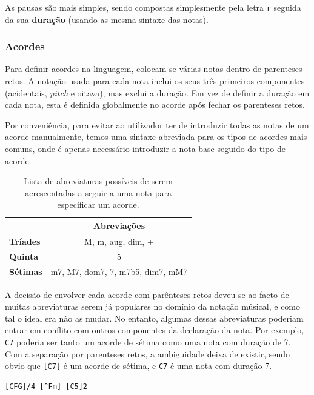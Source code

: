 As pausas são mais simples, sendo compostas simplesmente pela letra \texttt{r} seguida da sua \textbf{duração} (usando as mesma sintaxe das notas).

\subsubsection{\textbf{Acordes}}
Para definir acordes na linguagem, colocam-se várias notas dentro de parenteses retos. A notação usada para cada nota inclui os seus três primeiros componentes (acidentais, \textit{pitch} e oitava), mas exclui a duração. Em vez de definir a duração em cada nota, esta é definida globalmente no acorde após fechar os parenteses retos.

Por conveniência, para evitar ao utilizador ter de introduzir todas as notas de um acorde manualmente, temos uma sintaxe abreviada para os tipos de acordes mais comuns, onde é apenas necessário introduzir a nota base seguido do tipo de acorde.

\begin{table}[h]
\centering
\def\arraystretch{1.3}
\begin{tabular}{|l|c|}
\hline
\textbf{}        & \textbf{Abreviações}           \\ \hline
\textbf{Tríades} & M, m, aug, dim, +                \\ \hline
\textbf{Quinta}  & 5                                \\ \hline
\textbf{Sétimas} & m7, M7, dom7, 7, m7b5, dim7, mM7 \\ \hline
\end{tabular}
\caption{Lista de abreviaturas possíveis de serem acrescentadas a seguir a uma nota para especificar um acorde.}
\label{tab:modifiers-list}
\end{table}

A decisão de envolver cada acorde com parênteses retos deveu-se ao facto de muitas abreviaturas serem já populares no domínio da notação músical, e como tal o ideal era não as mudar. No entanto, algumas dessas abreviaturas poderiam entrar em conflito com outros componentes da declaração da nota. Por exemplo, \texttt{C7} poderia ser tanto um acorde de sétima como uma nota com duração de 7. Com a separação por parenteses retos, a ambiguidade deixa de existir, sendo obvio que \texttt{[C7]} é um acorde de sétima, e \texttt{C7} é uma nota com duração 7.

\begin{lstlisting}[caption={Exemplos de três definições de acordes possíveis}] 
[CFG]/4 [^Fm] [C5]2
\end{lstlisting}

